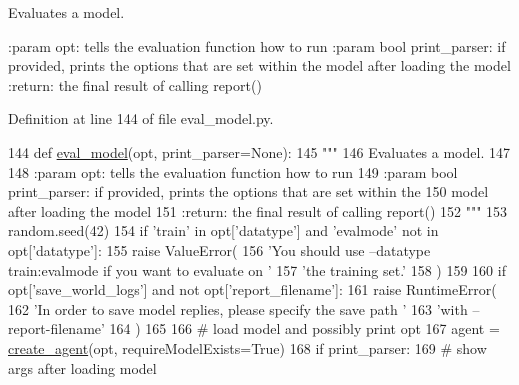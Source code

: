\begin{DoxyVerb}Evaluates a model.

:param opt: tells the evaluation function how to run
:param bool print_parser: if provided, prints the options that are set within the
    model after loading the model
:return: the final result of calling report()
\end{DoxyVerb}
 

Definition at line 144 of file eval\+\_\+model.\+py.


\begin{DoxyCode}
144 \textcolor{keyword}{def }\hyperlink{namespaceparlai_1_1scripts_1_1eval__model_ade1dfda1be70776553a1fbd6a3450c40}{eval\_model}(opt, print\_parser=None):
145     \textcolor{stringliteral}{"""}
146 \textcolor{stringliteral}{    Evaluates a model.}
147 \textcolor{stringliteral}{}
148 \textcolor{stringliteral}{    :param opt: tells the evaluation function how to run}
149 \textcolor{stringliteral}{    :param bool print\_parser: if provided, prints the options that are set within the}
150 \textcolor{stringliteral}{        model after loading the model}
151 \textcolor{stringliteral}{    :return: the final result of calling report()}
152 \textcolor{stringliteral}{    """}
153     random.seed(42)
154     \textcolor{keywordflow}{if} \textcolor{stringliteral}{'train'} \textcolor{keywordflow}{in} opt[\textcolor{stringliteral}{'datatype'}] \textcolor{keywordflow}{and} \textcolor{stringliteral}{'evalmode'} \textcolor{keywordflow}{not} \textcolor{keywordflow}{in} opt[\textcolor{stringliteral}{'datatype'}]:
155         \textcolor{keywordflow}{raise} ValueError(
156             \textcolor{stringliteral}{'You should use --datatype train:evalmode if you want to evaluate on '}
157             \textcolor{stringliteral}{'the training set.'}
158         )
159 
160     \textcolor{keywordflow}{if} opt[\textcolor{stringliteral}{'save\_world\_logs'}] \textcolor{keywordflow}{and} \textcolor{keywordflow}{not} opt[\textcolor{stringliteral}{'report\_filename'}]:
161         \textcolor{keywordflow}{raise} RuntimeError(
162             \textcolor{stringliteral}{'In order to save model replies, please specify the save path '}
163             \textcolor{stringliteral}{'with --report-filename'}
164         )
165 
166     \textcolor{comment}{# load model and possibly print opt}
167     agent = \hyperlink{namespaceparlai_1_1core_1_1agents_a00d77a7e26fb89e8bd900f7b2a02982a}{create\_agent}(opt, requireModelExists=\textcolor{keyword}{True})
168     \textcolor{keywordflow}{if} print\_parser:
169         \textcolor{comment}{# show args after loading model}

\end{DoxyCode}
